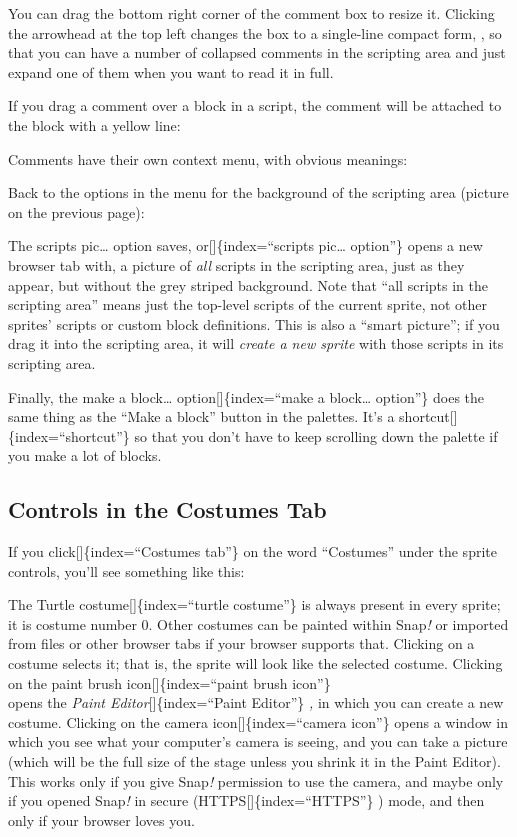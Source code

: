 \documentclass[
  letterpaper,
]{book}
\begin{document}
You can drag the bottom right corner of the comment box to resize it.
Clicking the arrowhead at the top left changes the box to a single-line
compact form, , so that you can have a number of collapsed comments in
the scripting area and just expand one of them when you want to read it
in full.

If you drag a comment over a block in a script, the comment will be
attached to the block with a yellow line:

Comments have their own context menu, with obvious meanings:

Back to the options in the menu for the background of the scripting area
(picture on the previous page):

The scripts pic\ldots{} option saves, or{[}{]}\{index=``scripts
pic\ldots{} option''\} opens a new browser tab with, a picture of
\emph{all} scripts in the scripting area, just as they appear, but
without the grey striped background. Note that ``all scripts in the
scripting area'' means just the top-level scripts of the current sprite,
not other sprites' scripts or custom block definitions. This is also a
``smart picture''; if you drag it into the scripting area, it will
\emph{create a new sprite} with those scripts in its scripting area.

Finally, the make a block\ldots{} option{[}{]}\{index=``make a
block\ldots{} option''\} does the same thing as the ``Make a block''
button in the palettes. It's a shortcut{[}{]}\{index=``shortcut''\} so
that you don't have to keep scrolling down the palette if you make a lot
of blocks.

\subsection{Controls in the Costumes
Tab}\label{controls-in-the-costumes-tab}

If you click{[}{]}\{index=``Costumes tab''\} on the word ``Costumes''
under the sprite controls, you'll see something like this:

The Turtle costume{[}{]}\{index=``turtle costume''\} is always present
in every sprite; it is costume number 0. Other costumes can be painted
within Snap\emph{!} or imported from files or other browser tabs if your
browser supports that. Clicking on a costume selects it; that is, the
sprite will look like the selected costume. Clicking on the paint brush
icon{[}{]}\{index=``paint brush icon''\}\\
opens the \emph{Paint Editor}{[}{]}\{index=``Paint Editor''\} \emph{,}
in which you can create a new costume. Clicking on the camera
icon{[}{]}\{index=``camera icon''\} opens a window in which you see what
your computer's camera is seeing, and you can take a picture (which will
be the full size of the stage unless you shrink it in the Paint Editor).
This works only if you give Snap\emph{!} permission to use the camera,
and maybe only if you opened Snap\emph{!} in secure
(HTTPS{[}{]}\{index=``HTTPS''\} ) mode, and then only if your browser
loves you.
\end{document}
